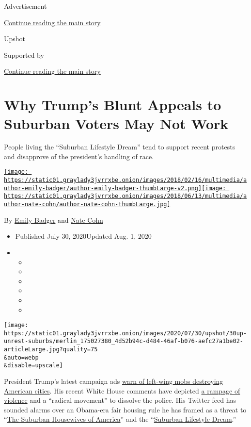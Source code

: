 Advertisement

\protect\hyperlink{after-top}{Continue reading the main story}

Upshot

Supported by

\protect\hyperlink{after-sponsor}{Continue reading the main story}

\hypertarget{why-trumps-blunt-appeals-to-suburban-voters-may-not-work}{%
\section{Why Trump's Blunt Appeals to Suburban Voters May Not
Work}\label{why-trumps-blunt-appeals-to-suburban-voters-may-not-work}}

People living the ``Suburban Lifestyle Dream'' tend to support recent
protests and disapprove of the president's handling of race.

\href{https://www.nytimes3xbfgragh.onion/by/emily-badger}{\texttt{[image: https://static01.graylady3jvrrxbe.onion/images/2018/02/16/multimedia/author-emily-badger/author-emily-badger-thumbLarge-v2.png]}}\href{https://www.nytimes3xbfgragh.onion/by/nate-cohn}{\texttt{[image: https://static01.graylady3jvrrxbe.onion/images/2018/06/13/multimedia/author-nate-cohn/author-nate-cohn-thumbLarge.jpg]}}

By \href{https://www.nytimes3xbfgragh.onion/by/emily-badger}{Emily
Badger} and \href{https://www.nytimes3xbfgragh.onion/by/nate-cohn}{Nate
Cohn}

\begin{itemize}
\item
  Published July 30, 2020Updated Aug. 1, 2020
\item
  \begin{itemize}
  \item
  \item
  \item
  \item
  \item
  \item
  \end{itemize}
\end{itemize}

\texttt{[image: https://static01.graylady3jvrrxbe.onion/images/2020/07/30/upshot/30up-unrest-suburbs/merlin\_175027380\_4d52b94c-d484-46af-b076-aefc27a1be02-articleLarge.jpg?quality=75\\\&auto=webp\\\&disable=upscale]}

President Trump's latest campaign ads
\href{https://www.nytimes3xbfgragh.onion/2020/07/21/us/politics/trump-campaign-ads.html}{warn
of left-wing mobs destroying American cities}. His recent White House
comments have depicted
\href{https://www.whitehouse.gov/briefings-statements/remarks-president-trump-operation-legend-combatting-violent-crime-american-cities/}{a
rampage of violence} and a ``radical movement'' to dissolve the police.
His Twitter feed has sounded alarms over an Obama-era fair housing rule
he has framed as a threat to
``\href{https://twitter.com/realDonaldTrump/status/1286372175117791236}{The
Suburban Housewives of America}'' and the
``\href{https://twitter.com/realDonaldTrump/status/1288509568578777088?s=20}{Suburban
Lifestyle Dream}.''

